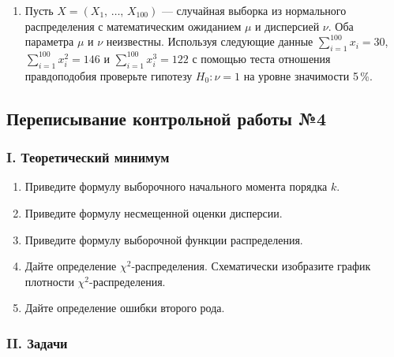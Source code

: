 \documentclass[12pt, a4paper]{article}\usepackage[]{graphicx}\usepackage[]{color}
\begin{document}
\begin{enumerate}
\item Пусть $X = (X_1, \, \ldots, \, X_{100})$ — случайная выборка из нормального распределения с математическим ожиданием $\mu$ и дисперсией $\nu$. Оба параметра $\mu$ и $\nu$ неизвестны. Используя следующие данные $\sum_{i=1}^{100}x_i = 30$, $\sum_{i=1}^{100}x_i^2 = 146$ и $\sum_{i=1}^{100}x_i^3 = 122$ с помощью теста отношения правдоподобия проверьте гипотезу $H_0 \colon \nu = 1$ на уровне значимости 5\,\%.

\end{enumerate}

\subsection{Переписывание контрольной работы №4}


\subsubsection*{I. Теоретический минимум}

\begin{enumerate}
\item Приведите формулу выборочного начального момента порядка $k$.
\item Приведите формулу несмещенной оценки дисперсии.
\item Приведите формулу выборочной функции распределения.
\item Дайте определение $\chi^2$-распределения. Схематически изобразите график плотности $\chi^2$-распределения.
\item Дайте определение ошибки второго рода.
\end{enumerate}


\subsubsection*{II. Задачи}
\end{document}
